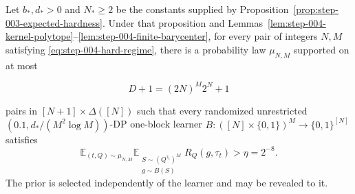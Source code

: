 \begin{proposition}\label{prop:step-004-finite-hard-prior}
Let \(b_*,d_*>0\) and \(N_*\ge2\) be the constants supplied by Proposition~\ref{prop:step-003-expected-hardness}. Under that proposition and
Lemmas~\ref{lem:step-004-kernel-polytope}--\ref{lem:step-004-finite-barycenter},
for every pair of integers \(N,M\) satisfying
\eqref{eq:step-004-hard-regime}, there
is a probability law \(\mu_{N,M}\) supported on at most

\[
D+1=(2N)^M2^N+1
\tag{S4.25}\label{eq:step-004-25}
\]

pairs in \([N+1]\times\Delta([N])\) such that every randomized unrestricted
\((0.1,d_*/(M^2\log M))\)-DP one-block learner
$B:([N]\times\{0,1\})^M\to\{0,1\}^{[N]}$ satisfies
\[
\mathbb E_{(t,Q)\sim\mu_{N,M}}
\mathbb E_{\substack{S\sim(Q^{\tau_t})^M\\g\sim B(S)}}
R_Q(g,\tau_t)>\eta=2^{-8}.
\]
The prior is selected independently of the learner and may be revealed to it.
\end{proposition}

